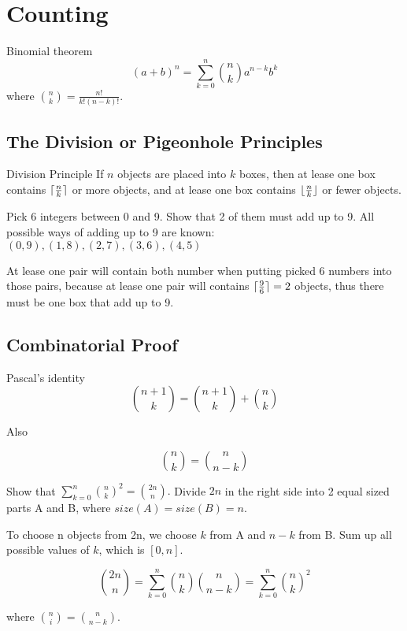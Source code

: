 \documentclass[10pt,a4paper]{article}
\DeclarePairedDelimiter\ceil{\lceil}{\rceil}
\DeclarePairedDelimiter\floor{\lfloor}{\rfloor}
\begin{document}
  \section{Counting}

  \begin{fact}{Binomial theorem}{}
    \[
    (a+b)^n = \sum_{k=0}^n \binom{n}{k} a^{n-k}b^k
    \]
    where $\binom{n}{k} = \frac{n!}{k!(n-k)!}$.
  \end{fact}

  \subsection{The Division or Pigeonhole Principles}

  \begin{fact}{Division Principle}{}
    If $n$ objects are placed into $k$ boxes,
    then at lease one box contains $\ceil{\frac{n}{k}}$ or more objects,
    and at lease one box contains $\floor{\frac{n}{k}}$ or fewer objects.
  \end{fact}

  \begin{exec}{}{}
    Pick 6 integers between 0 and 9. Show that 2 of them must add up to 9.
    \tcblower
    All possible ways of adding up to 9 are known:
    $(0,9),(1,8),(2,7),(3,6),(4,5)$

    At lease one pair will contain both number when putting picked 6 numbers into those pairs, because at lease one pair will contains $\ceil{\frac{9}{6}}=2$ objects, thus there must be one box that add up to 9.
  \end{exec}

  \subsection{Combinatorial Proof}

  \begin{fact}{Pascal’s identity}{}
    \[
    {n+1 \choose k} = {n+1 \choose k} + {n \choose k}
    \]
  \end{fact}

  Also

  \[
  {n \choose k} = {n \choose n-k}
  \]

  \begin{exec}{}{}
    Show that $\sum_{k=0}^{n}{n \choose k}^2 = {2n \choose n}.$
    \tcblower
    Divide $2n$ in the right side into 2 equal sized parts A and B, where $size(A)=size(B)=n$.

    To choose n objects from 2n, we choose $k$ from A and $n-k$ from B.
    Sum up all possible values of $k$, which is $[0,n]$.

    \[
    {2n \choose n} = \sum_{k=0}^{n}{n \choose k}{n \choose n-k} = \sum_{k=0}^{n}{n \choose k}^2
    \]

    where ${n \choose i} = {n \choose n-k}$.
  \end{exec}
\end{document}

